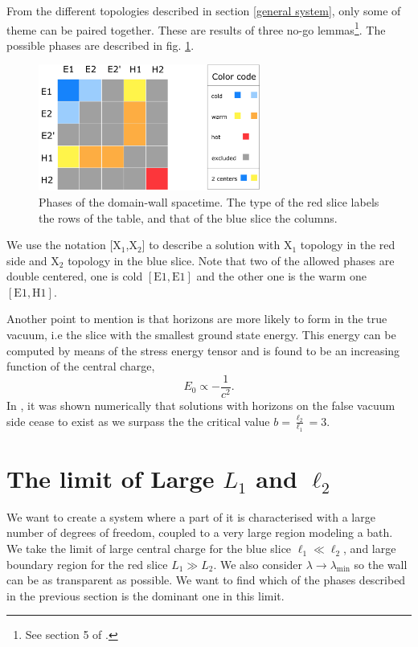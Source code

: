 From the different topologies described in section \ref{general system}, only some of theme can be paired together. These are results of three no-go lemmas\footnote{See section 5 of \cite{Bachas_2021}.}. The possible phases are described in fig. \ref{table}.

\begin{figure}
    \centering
    \includegraphics[width=0.65\textwidth]{figures/table.png}
    \caption{Phases of the domain-wall spacetime. The type of the red slice labels the rows of the table, and that of the blue slice the columns.}
    \label{table}
\end{figure}

We use the notation $[$X$_1$,X$_2]$ to describe a solution with X$_1$ topology in the red side and X$_2$ topology in the blue slice. Note that two of the allowed phases are double centered, one is cold $\left[\text{E}1,\text{E}1\right]$ and the other one is the warm one $\left[\text{E}1,\text{H}1\right]$. 

Another point to mention is that horizons are more likely to form in the true vacuum, i.e the slice with the smallest ground state energy. This energy can be computed by means of the stress energy tensor and is found to be an increasing function of the central charge,
\begin{equation}
    E_0 \propto -\frac{1}{c^2}.
\end{equation}
In \cite{Bachas_2021}, it was shown numerically that solutions with horizons on the false vacuum side cease to exist as we surpass the the critical value $b=\frac{\ell_2}{\ell_1}=3$.

\section{The limit of Large $L_1$ and $\ell_2$}\label{limit}

We want to create a system where a part of it is characterised with a large number of degrees of freedom, coupled to a very large region modeling a bath. We take the limit of large central charge for the blue slice $\ell_1\ll \ell_2$, and large boundary region for the red slice $L_1\gg L_2$. We also consider $\lambda\rightarrow\lambda_{\text{min}}$ so the wall can be as transparent as possible. We want to find which of the phases described in the previous section is the dominant one in this limit.

